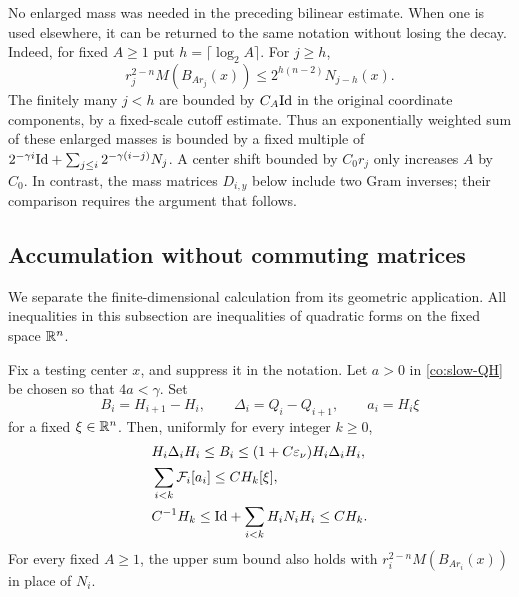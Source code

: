 \begin{remark}\label{co:enlargement-indexing}
No enlarged mass was needed in the preceding bilinear estimate.
When one is used elsewhere, it can be returned to the same
notation without losing the decay.  Indeed, for fixed \(A\ge1\)
put \(h=\lceil\log_2 A\rceil\).  For \(j\ge h\),
\[
 r_j^{2-n}M(B_{Ar_j}(x))\le2^{h(n-2)}N_{j-h}(x).
\]
The finitely many \(j<h\) are bounded by \(C_A\mathrm{Id}\) in the
original coordinate components, by a fixed-scale cutoff estimate.
Thus an exponentially weighted sum of these enlarged masses is
bounded by a fixed multiple of
\(2^{-\gamma i}\mathrm{Id}+\sum_{j\le i}2^{-\gamma(i-j)}N_j\).
A center shift bounded by \(C_0r_j\) only increases \(A\) by
\(C_0\).  In contrast, the mass matrices \(D_{i,y}\) below include
two Gram inverses; their comparison requires the argument that
follows.
\end{remark}

\subsection{Accumulation without commuting matrices}

We separate the finite-dimensional calculation from its geometric
application.  All inequalities in this subsection are inequalities
of quadratic forms on the fixed space \(\mathbb R^n\).

\begin{lemma}\label{co:inverse-increments}
Fix a testing center \(x\), and suppress it in the notation.
Let \(a>0\) in \eqref{co:slow-QH} be chosen so that
\(4a<\gamma\).  Set
\[
 B_i=H_{i+1}-H_i,\qquad \Delta_i=Q_i-Q_{i+1},
 \qquad a_i=H_i\xi
\]
for a fixed \(\xi\in\mathbb R^n\).  Then, uniformly for every integer
\(k\ge0\),
\begin{align}
 &H_i\Delta_iH_i\le B_i\le(1+C\varepsilon_\nu)H_i\Delta_iH_i,
             \label{co:inverse-increment-order}\\
 &\sum_{i<k}\mathcal F_i[a_i]\le C H_k[\xi],
             \label{co:weighted-total}\\
 &C^{-1}H_k\le \mathrm{Id}+\sum_{i<k}H_iN_iH_i\le C H_k.
             \label{co:central-cumulative}
\end{align}
For every fixed \(A\ge1\), the upper sum bound also holds with
\(r_i^{2-n}M(B_{Ar_i}(x))\) in place of \(N_i\).
\end{lemma}

